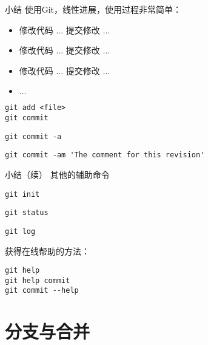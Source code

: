 \begin{frame}[fragile]{小结}
\onslide<+->
使用Git，线性进展，使用过程非常简单：
\onslide<+->
    \begin{itemize}
        \item 修改代码 \(\ldots\) 提交修改 \(\ldots\)
        \item 修改代码 \(\ldots\) 提交修改 \(\ldots\)
        \item 修改代码 \(\ldots\) 提交修改 \(\ldots\)
        \item \(\ldots\)
    \end{itemize}
\onslide<+->
    \begin{Verbatim}[frame=single,commandchars=\\\{\}]
git add <file>
git commit
    \end{Verbatim}
\onslide<+->
    \begin{Verbatim}[frame=single,commandchars=\\\{\}]
git commit -a
    \end{Verbatim}
\onslide<+->
    \begin{Verbatim}[frame=single,commandchars=\\\{\}]
git commit -am 'The comment for this revision'
    \end{Verbatim}
\end{frame}

\begin{frame}[fragile]{小结（续）}
\onslide<+->
其他的辅助命令
\onslide<+->
    \begin{Verbatim}[frame=single,commandchars=\\\{\}]
git init
    \end{Verbatim}
\onslide<+->
    \begin{Verbatim}[frame=single,commandchars=\\\{\}]
git status
    \end{Verbatim}
\onslide<+->
    \begin{Verbatim}[frame=single,commandchars=\\\{\}]
git log
    \end{Verbatim}
\onslide<+->

获得在线帮助的方法：
    \begin{Verbatim}[frame=single,commandchars=\\\{\}]
git help
git help commit
git commit --help
    \end{Verbatim}
\end{frame}


\part{分支与合并}

